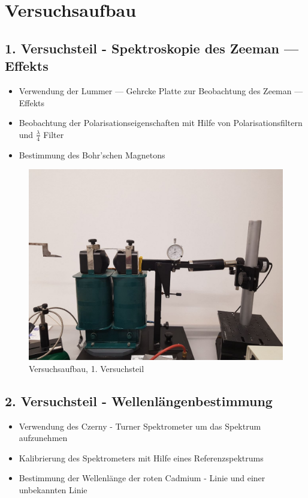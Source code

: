 
\section{Versuchsaufbau}

\subsection{1. Versuchsteil - Spektroskopie des Zeeman --- Effekts}
        \begin{myframe}{\subsecname}
            \begin{itemize}
                \item Verwendung der Lummer --- Gehrcke Platte zur Beobachtung des Zeeman --- Effekts
                \item Beobachtung der Polarisationseigenschaften mit Hilfe von Polarisationsfiltern und $\frac{\lambda}{4}$ Filter
                \item Bestimmung des Bohr'schen Magnetons
            \end{itemize}
        \end{myframe}

        \begin{myframe}{\subsecname}
            \begin{figure}
                \includegraphics[width=0.6\linewidth]{img/IMG-20180102-WA0000.jpg}
                \caption{Versuchsaufbau, 1. Versuchsteil}
            \end{figure}
        \end{myframe}


    \subsection{2. Versuchsteil - Wellenlängenbestimmung}
        \begin{myframe}{\subsecname}
            \begin{itemize}
                \item Verwendung des Czerny - Turner Spektrometer um das Spektrum aufzunehmen
                \item Kalibrierung des Spektrometers mit Hilfe eines Referenzspektrums
                \item Bestimmung der Wellenlänge der roten Cadmium - Linie und einer unbekannten Linie
            \end{itemize}
        \end{myframe}

